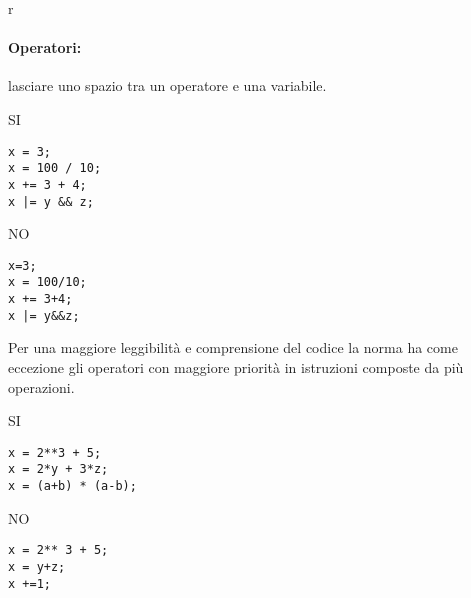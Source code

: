 r\documentclass[../ProcessiPrimari.tex]{subfiles}
\begin{document}
\paragraph*{Operatori: }
lasciare uno spazio tra un operatore e una variabile.
\begin{center}{
\begin{minipage}{5cm}
{\begin{center}SI\end{center}}
\begin{Verbatim}[frame=single]
x = 3;
x = 100 / 10;
x += 3 + 4;
x |= y && z;
\end{Verbatim}
\end{minipage}
\hfil
\begin{minipage}{5cm}
{\begin{center}NO\end{center}}
\begin{Verbatim}[frame=single]
x=3;
x = 100/10;
x += 3+4;
x |= y&&z;
\end{Verbatim}
\end{minipage}
}
\end{center}
Per una maggiore leggibilità e comprensione del codice la norma ha come eccezione gli operatori con maggiore priorità in istruzioni composte da più operazioni.
\begin{center}{
\begin{minipage}{5cm}
{\begin{center}SI\end{center}}
\begin{Verbatim}[frame=single]
x = 2**3 + 5;
x = 2*y + 3*z;
x = (a+b) * (a-b);
\end{Verbatim}
\end{minipage}
\hfil
\begin{minipage}{5cm}
{\begin{center}NO\end{center}}
\begin{Verbatim}[frame=single]
x = 2** 3 + 5;
x = y+z;
x +=1;
\end{Verbatim}
\end{minipage}
}
\end{center}
\end{document}
